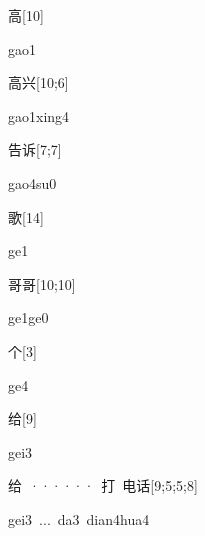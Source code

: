   \begin{verbete}[gao1]{高}[10]
\begin{pronuncia}{gao1}
\end{pronuncia}
\end{verbete}

\begin{verbete}{高兴}[10;6]
\begin{pronuncia}{gao1xing4}
\end{pronuncia}
\end{verbete}

\begin{verbete}[gao4su0]{告诉}[7;7]
\begin{pronuncia}{gao4su0}
\end{pronuncia}
\end{verbete}

\begin{verbete}[ge1]{歌}[14]
\begin{pronuncia}{ge1}
\end{pronuncia}
\end{verbete}

\begin{verbete}[ge1ge0]{哥哥}[10;10]
\begin{pronuncia}{ge1ge0}
\end{pronuncia}
\end{verbete}

\begin{verbete}[ge4]{个}[3]
\begin{pronuncia}{ge4}
\end{pronuncia}
\end{verbete}

\begin{verbete}[gei3]{给}[9]
\begin{pronuncia}{gei3}
\end{pronuncia}
\end{verbete}

\begin{verbete}{给\ ······\ 打\ 电话}[9;5;5;8]
\begin{pronuncia}[\\]{gei3\ ...\ da3\ dian4hua4}
\end{pronuncia}
\end{verbete}

